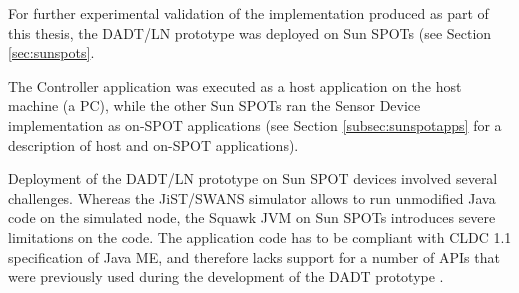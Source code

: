For further experimental validation of the implementation produced as part of 
this thesis, the DADT/LN prototype was deployed on Sun SPOTs \cite{simon_squawk:2006} (see Section \ref{sec:sunspots}. 

The Controller application was executed as a host application on the host machine (a
PC), while the other Sun SPOTs ran the Sensor Device implementation as on-SPOT
applications (see Section \ref{subsec:sunspotapps} for a description of host and on-SPOT
applications).

Deployment of the DADT/LN prototype on Sun SPOT devices involved several
challenges. Whereas the JiST/SWANS simulator allows to run unmodified Java code on
the simulated node, the Squawk JVM on Sun SPOTs introduces severe limitations
on the code. The application code has to be compliant with CLDC 1.1
specification of Java ME, and therefore lacks support for a number of APIs that were previously used during the development of the DADT prototype \cite{migliavacca_DADT:2006}.